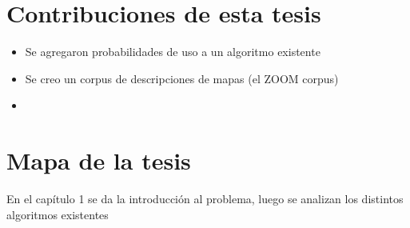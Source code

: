 

\section{Contribuciones de esta tesis}
\label{sec:contribiciones}

\begin{itemize}
\item Se agregaron probabilidades de uso a un algoritmo existente
\item Se creo un corpus de descripciones de mapas (el ZOOM corpus)
\item
\end{itemize}
\section{Mapa de la tesis}
\label{sec:mapadetesis}

En el cap\'itulo 1 se da la introducci\'on al problema, luego se analizan los distintos algoritmos existentes



